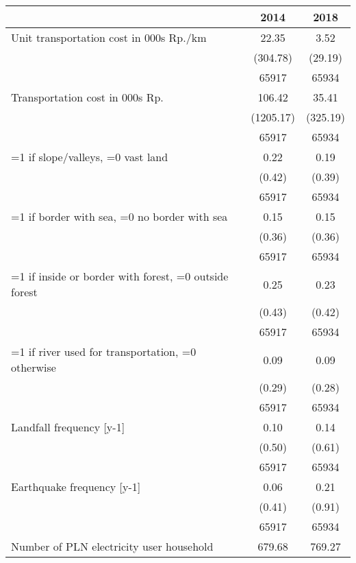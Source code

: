 \begin{tabular}{l*{2}{c}}
\hline\hline
                    &        2014&        2018\\
\hline
Unit transportation cost in 000s Rp./km&       22.35&        3.52\\
                    &    (304.78)&     (29.19)\\
                    &       65917&       65934\\
[1em]
Transportation cost in 000s Rp.&      106.42&       35.41\\
                    &   (1205.17)&    (325.19)\\
                    &       65917&       65934\\
[1em]
=1 if slope/valleys, =0 vast land&        0.22&        0.19\\
                    &      (0.42)&      (0.39)\\
                    &       65917&       65934\\
[1em]
=1 if border with sea, =0 no border with sea&        0.15&        0.15\\
                    &      (0.36)&      (0.36)\\
                    &       65917&       65934\\
[1em]
=1 if inside or border with forest, =0 outside forest&        0.25&        0.23\\
                    &      (0.43)&      (0.42)\\
                    &       65917&       65934\\
[1em]
=1 if river used for transportation, =0 otherwise&        0.09&        0.09\\
                    &      (0.29)&      (0.28)\\
                    &       65917&       65934\\
[1em]
Landfall frequency [y-1]&        0.10&        0.14\\
                    &      (0.50)&      (0.61)\\
                    &       65917&       65934\\
[1em]
Earthquake frequency [y-1]&        0.06&        0.21\\
                    &      (0.41)&      (0.91)\\
                    &       65917&       65934\\
[1em]
Number of PLN electricity user household&      679.68&      769.27\\

\end{tabular}
